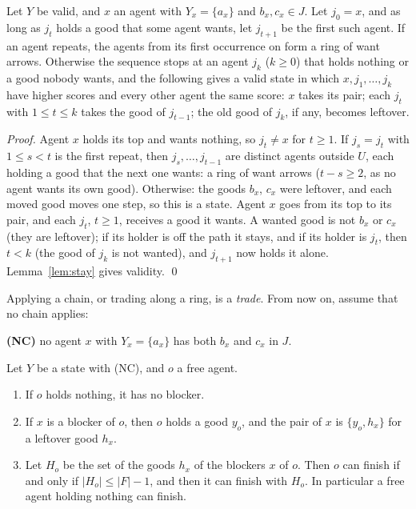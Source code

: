 \documentclass[runningheads,11pt]{llncs}
\begin{document}
\begin{lemma}[chain]\label{lem:chain}
Let $Y$ be valid, and $x$ an agent with $Y_x=\{a_x\}$ and $b_x,c_x\in J$. Let $j_0=x$, and as long as $j_t$ holds a good that some agent wants, let $j_{t+1}$ be the first such agent. If an agent repeats, the agents from its first occurrence on form a ring of want arrows. Otherwise the sequence stops at an agent $j_k$ ($k\ge0$) that holds nothing or a good nobody wants, and the following gives a valid state in which $x,j_1,\dots,j_k$ have higher scores and every other agent the same score: $x$ takes its pair; each $j_t$ with $1\le t\le k$ takes the good of $j_{t-1}$; the old good of $j_k$, if any, becomes leftover.
\end{lemma}

\begin{proof}
Agent $x$ holds its top and wants nothing, so $j_t\ne x$ for $t\ge1$. If $j_s=j_t$ with $1\le s<t$ is the first repeat, then $j_s,\dots,j_{t-1}$ are distinct agents outside $U$, each holding a good that the next one wants: a ring of want arrows ($t-s\ge2$, as no agent wants its own good). Otherwise: the goods $b_x$, $c_x$ were leftover, and each moved good moves one step, so this is a state. Agent $x$ goes from its top to its pair, and each $j_t$, $t\ge1$, receives a good it wants. A wanted good is not $b_x$ or $c_x$ (they are leftover); if its holder is off the path it stays, and if its holder is $j_t$, then $t<k$ (the good of $j_k$ is not wanted), and $j_{t+1}$ now holds it alone. Lemma~\ref{lem:stay} gives validity. \qed
\end{proof}

\noindent Applying a chain, or trading along a ring, is a \emph{trade}. From now on, assume that no chain applies:

\smallskip
\noindent\textbf{(NC)} no agent $x$ with $Y_x=\{a_x\}$ has both $b_x$ and $c_x$ in $J$.
\smallskip

\begin{lemma}\label{lem:test}
Let $Y$ be a state with (NC), and $o$ a free agent.
\begin{enumerate}
\item[(a)] If $o$ holds nothing, it has no blocker.
\item[(b)] If $x$ is a blocker of $o$, then $o$ holds a good $y_o$, and the pair of $x$ is $\{y_o,h_x\}$ for a leftover good $h_x$.
\item[(c)] Let $H_o$ be the set of the goods $h_x$ of the blockers $x$ of $o$. Then $o$ can finish if and only if $|H_o|\le|F|-1$, and then it can finish with $H_o$. In particular a free agent holding nothing can finish.
\end{enumerate}
\end{lemma}
\end{document}
